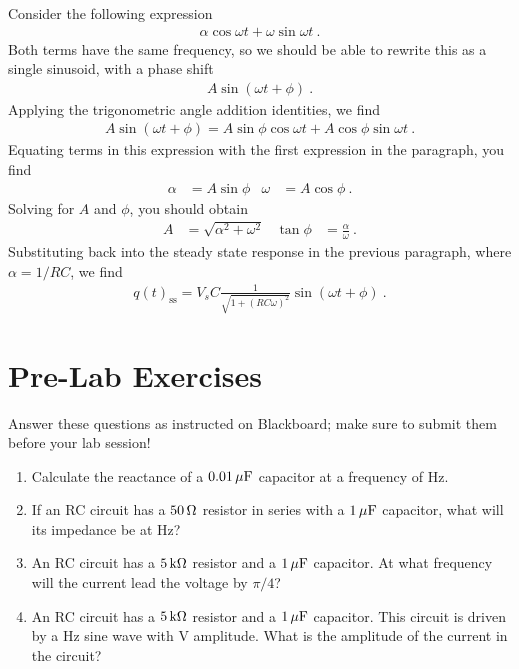 \documentclass[12pt]{article}
\begin{document}
Consider the following expression
\begin{gather*}
  \alpha \cos \omega t + \omega \sin \omega t\ .
\end{gather*}
Both terms have the same frequency, so we should be able to rewrite
this as a single sinusoid, with a phase shift
\begin{gather*}
  A \sin (\omega t + \phi)\ .
\end{gather*}
Applying the trigonometric angle addition identities, we find
\begin{gather*}
  A \sin (\omega t + \phi) = A \sin\phi \cos\omega t + A \cos\phi
  \sin\omega t\ .
\end{gather*}
Equating terms in this expression with the first expression in the
paragraph, you find
\begin{align*}
  \alpha &= A \sin\phi & \omega &= A \cos\phi\ .
\end{align*}
Solving for $A$ and $\phi$, you should obtain
\begin{align*}
  A &= \sqrt{\alpha^2 + \omega^2}  & \tan\phi &=
  \frac{\alpha}{\omega}\ .
\end{align*}
Substituting back into the steady state response in the previous
paragraph, where $\alpha = 1/RC$, we find
\begin{gather*}
  q(t)_\mathrm{ss} = V_s C \frac{1}{\sqrt{1+(RC\omega)^2}}
  \sin(\omega t + \phi)\ .
\end{gather*}

\newpage

\section*{Pre-Lab Exercises}

Answer these questions as instructed on Blackboard; make sure to
submit them before your lab session!

\begin{enumerate}
\item Calculate the reactance of a $\unit[0.01]{\mu F}$ capacitor at a
  frequency of \unit[250]{Hz}.
\item If an RC circuit has a $\unit[50]{\Omega}$ resistor in series
  with a $\unit[1]{\mu F}$ capacitor, what will its impedance be at
  \unit[500]{Hz}?
\item An RC circuit has a $\unit[5]{k\Omega}$ resistor and a
  $\unit[1]{\mu F}$ capacitor.  At what frequency will the current
  lead the voltage by $\pi/4$?
\item An RC circuit has a $\unit[5]{k\Omega}$ resistor and a
  $\unit[1]{\mu F}$ capacitor.  This circuit is driven by a
  \unit[100]{Hz} sine wave with \unit[1]{V} amplitude.  What is the
  amplitude of the current in the circuit?
\end{enumerate}
\end{document}
